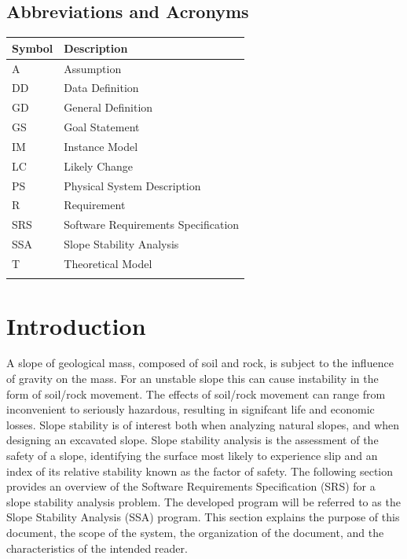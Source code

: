 \documentclass[12pt]{article}
\begin{document}
\subsection{Abbreviations and Acronyms}
\label{Sec:AbbrandAcro}
\begin{longtable*}{l l}
\toprule
Symbol & Description
\\
\midrule
A & Assumption
\\
DD & Data Definition
\\
GD & General Definition
\\
GS & Goal Statement
\\
IM & Instance Model
\\
LC & Likely Change
\\
PS & Physical System Description
\\
R & Requirement
\\
SRS & Software Requirements Specification
\\
SSA & Slope Stability Analysis
\\
T & Theoretical Model
\\
\bottomrule
\label{Table:AbbrandAcro}
\end{longtable*}
\section{Introduction}
\label{Sec:Intr}
A slope of geological mass, composed of soil and rock, is subject to the influence of gravity on the mass. For an unstable slope this can cause instability in the form of soil/rock movement. The effects of soil/rock movement can range from inconvenient to seriously hazardous, resulting in signifcant life and economic losses. Slope stability is of interest both when analyzing natural slopes, and when designing an excavated slope. Slope stability analysis is the assessment of the safety of a slope, identifying the surface most likely to experience slip and an index of its relative stability known as the factor of safety.
The following section provides an overview of the Software Requirements Specification (SRS) for a slope stability analysis problem. The developed program will be referred to as the Slope Stability Analysis (SSA) program. This section explains the purpose of this document, the scope of the system, the organization of the document, and the characteristics of the intended reader.
\end{document}
